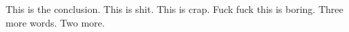 
This is the conclusion.  This is shit. This is crap. Fuck fuck this is boring. Three more words. Two more.
